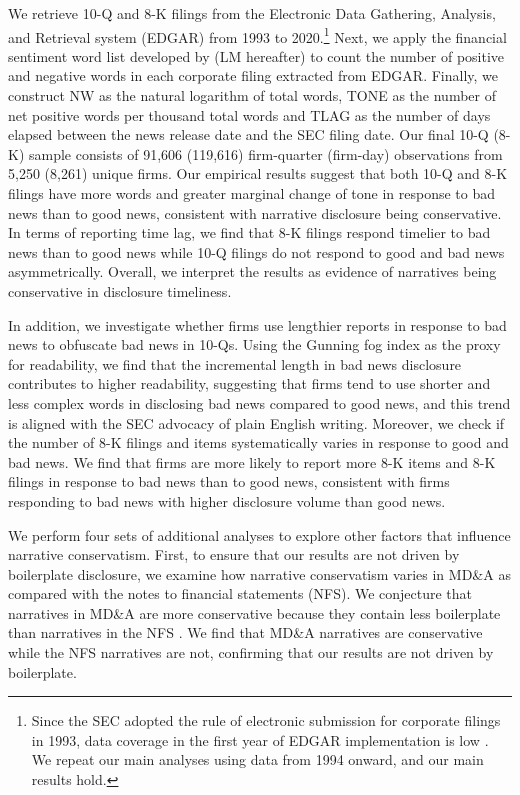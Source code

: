 \documentclass[letterpaper,12pt]{article}
\begin{document}
\begin{spacing}{1.5}
We retrieve 10-Q and 8-K filings from the Electronic Data Gathering, Analysis, and Retrieval system (EDGAR) from 1993 to 2020.\footnote{Since the SEC adopted the rule of electronic submission for corporate filings in 1993, data coverage in the first year of EDGAR implementation is low \cite{gaoInformingMarketEffect2020}. We repeat our main analyses using data from 1994 onward, and our main results hold.} Next, we apply the financial sentiment word list developed by  (LM hereafter) to count the number of positive and negative words in each corporate filing extracted from EDGAR. Finally, we construct NW as the natural logarithm of total words, TONE as the number of net positive words per thousand total words and TLAG as the number of days elapsed between the news release date and the SEC filing date. Our final 10-Q (8-K) sample consists of 91,606 (119,616) firm-quarter (firm-day) observations from 5,250 (8,261) unique firms. Our empirical results suggest that both 10-Q and 8-K filings have more words and greater marginal change of tone in response to bad news than to good news, consistent with narrative disclosure being conservative. In terms of reporting time lag, we find that 8-K filings respond timelier to bad news than to good news while 10-Q filings do not respond to good and bad news asymmetrically. Overall, we interpret the results as evidence of narratives being conservative in disclosure timeliness.

In addition, we investigate whether firms use lengthier reports in response to bad news to obfuscate bad news in 10-Qs. Using the Gunning fog index as the proxy for readability, we find that the incremental length in bad news disclosure contributes to higher readability, suggesting that firms tend to use shorter and less complex words in disclosing bad news compared to good news, and this trend is aligned with the SEC advocacy of plain English writing. Moreover, we check if the number of 8-K filings and items systematically varies in response to good and bad news. We find that firms are more likely to report more 8-K items and 8-K filings in response to bad news than to good news, consistent with firms responding to bad news with higher disclosure volume than good news.

We perform four sets of additional analyses to explore other factors that influence narrative conservatism. First, to ensure that our results are not driven by boilerplate disclosure, we examine how narrative conservatism varies in MD\&A as compared with the notes to financial statements (NFS). We conjecture that narratives in MD\&A are more conservative because they contain less boilerplate than narratives in the NFS \cite{secFinancialReportingManual2019}. We find that MD\&A narratives are conservative while the NFS narratives are not, confirming that our results are not driven by boilerplate. 


\end{spacing}
\end{document}
